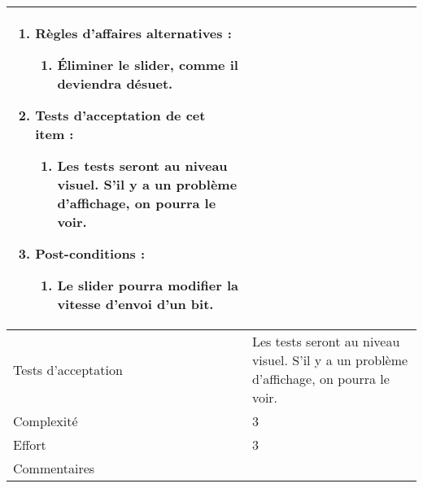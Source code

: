 \begin{longtable}{|l|p{}|}
\begin{enumerate}[label*=\arabic*.]
\begin{enumerate}[label*=\arabic*.]
                                \item Règles d'affaires alternatives :
                                \begin{enumerate}[label*=\arabic*.]
                                    \item Éliminer le slider, comme il deviendra désuet.
                                \end{enumerate}
                                \item Tests d'acceptation de cet item :
                                \begin{enumerate}[label*=\arabic*.]
                                    \item Les tests seront au niveau visuel. S'il y a un problème d'affichage, on pourra le voir.
                                \end{enumerate}
                                \item Post-conditions :
                                \begin{enumerate}[label*=\arabic*.]
                                    \item Le slider pourra modifier la vitesse d'envoi d'un bit.
                                \end{enumerate}
                            \end{enumerate}
        \end{enumerate} \\
\hline
    Tests d'acceptation & Les tests seront au niveau visuel. S'il y a un problème d'affichage, on pourra le voir. \\
\hline
    Complexité & 3 \\
\hline
    Effort & 3 \\
\hline
    Commentaires &  \\
    

\end{longtable}
